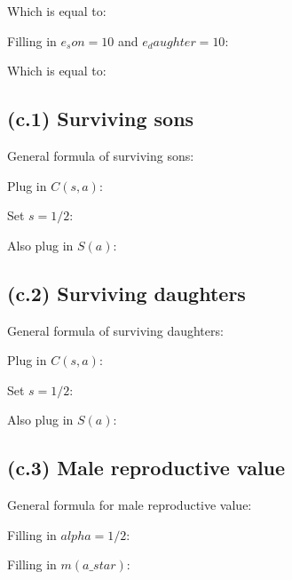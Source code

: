 \documentclass[11]{article}
\begin{document}
Which is equal to:



Filling in $e_son=10$ and $e_daughter=10$:



Which is equal to:




\subsection{(c.1) Surviving sons}

General formula of surviving sons:



Plug in $C(s,a)$:



Set $s=1/2$:



Also plug in $S(a)$:



\subsection{(c.2) Surviving daughters}

General formula of surviving daughters:



Plug in $C(s,a)$:



Set $s=1/2$:



Also plug in $S(a)$:



\subsection{(c.3) Male reproductive value}

General formula for male reproductive value:



Filling in $alpha=1/2$:



Filling in $m(a\_star)$:


\end{document}
